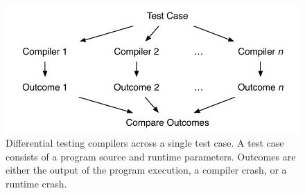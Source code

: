 \begin{figure}
  \centering
  \includegraphics[width=.9\columnwidth]{img/difftest} %
  \caption{%
    Differential testing compilers across a single test case. A test case consists of a program source and runtime parameters. Outcomes are either the output of the program execution, a compiler crash, or a runtime crash.%
  }%
  \label{fig:difftest}
\end{figure}